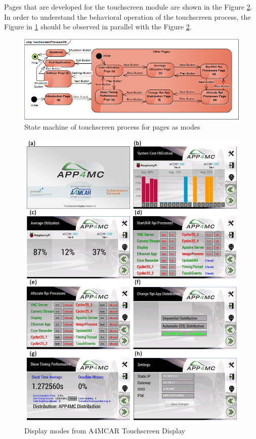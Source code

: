 Pages that are developed for the touchscreen module are shown in the Figure \ref{fig:displays}. In order to understand the behavioral operation of the touchscreen process, the Figure in \ref{fig:TouchscreenProcessSM} should be observed in parallel with the Figure \ref{fig:displays}. 
\begin{figure}[!ht]
	\centering
	\captionsetup{justification=centering}
	\includegraphics[width=\textwidth]{content/images/TouchscreenProcessSM.png}
	\caption{State machine of touchscreen process for pages as modes}
	\label{fig:TouchscreenProcessSM}
\end{figure}
\begin{figure}[!ht]
	\centering
	\captionsetup{justification=centering}
	\includegraphics[width=\textwidth]{content/images/displays.png}
	\caption{Display modes from A4MCAR Touchscreen Display}
	\label{fig:displays}
\end{figure}

